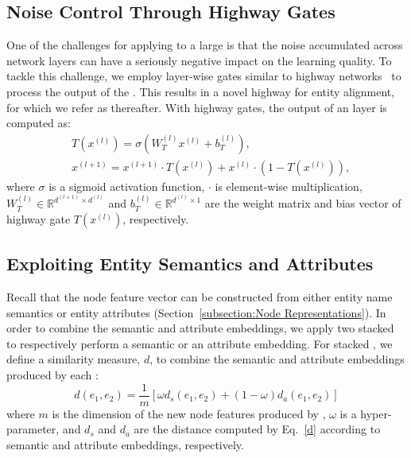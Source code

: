 	\subsection{Noise Control Through Highway Gates}
	\label{section:hgcn}
One of the challenges for applying \GCNs to a large \KG is that the noise accumulated across network layers can have a seriously negative
impact on the learning quality. To tackle this challenge, we employ layer-wise gates similar to highway
networks~\cite{Srivastava2015Highway} to process the output of the \RGCN. This results in a novel highway \RGCN for entity alignment, for
which we refer as \HRGCN thereafter. With highway gates, the output of an \HRGCN layer is computed as:
%
%
	\begin{equation}
	\begin{split}
	&T(x^{(l)})=\sigma(W_T^{(l)}x^{(l)}+b_T^{(l)}), \\
	&x^{(l+1)}=x^{(l+1)} \cdot T(x^{(l)})+x^{(l)} \cdot (1-T(x^{(l)})),
	\end{split}
	\end{equation}
	where $\sigma$ is a sigmoid activation function, $\cdot$ is element-wise multiplication, $W_T^{(l)} \in \mathbb{R}^{d^{(l+1)} \times
d^{(l)}}$ and $b_T^{(l)} \in \mathbb{R}^{d^{(l)} \times 1}$ are the weight matrix and bias vector of highway gate $T(x^{(l)})$,
respectively.


\subsection{Exploiting Entity Semantics and Attributes\label{sec:combine}}
    Recall that the node feature vector can be constructed from either entity name semantics or entity attributes (Section~\ref{subsection:Node
    Representations}). In order to combine the semantic and attribute embeddings, we apply two stacked \HRGCNs to respectively perform a
    semantic or an attribute embedding. For stacked \HRGCNs, we define a similarity measure, $d$, to combine the semantic and attribute embeddings produced by each \HRGCN:
	\begin{equation}
		d(e_1,e_2)=\frac{1}{m}[\omega d_s(e_1,e_2)+(1-\omega)d_a(e_1,e_2)]
	\end{equation}
	where $m$ is the dimension of the new node features produced by \HRGCNs, $\omega$ is a hyper-parameter, and $d_s$ and $d_a$ are the distance computed by Eq.~\ref{d} according to semantic and attribute embeddings, respectively.
	
